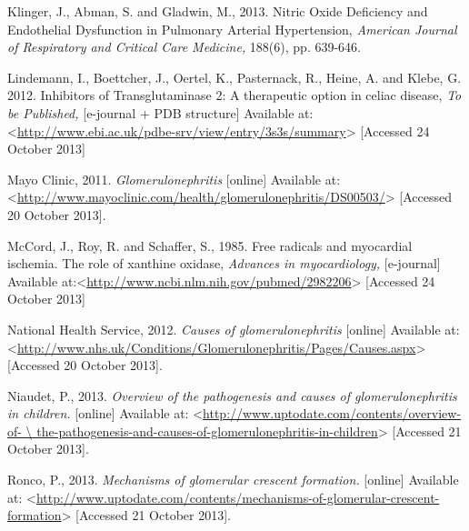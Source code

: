 \documentclass[12pt]{report}
\begin{document}
Klinger, J., Abman, S. and Gladwin, M., 2013. Nitric Oxide Deficiency and Endothelial Dysfunction in Pulmonary Arterial Hypertension, \textit{American Journal of Respiratory and Critical Care Medicine,} 188(6), pp. 639-646.
\newline
\newline

Lindemann, I., Boettcher, J., Oertel, K., Pasternack, R., Heine, A. and Klebe, G. 2012. Inhibitors of Transglutaminase 2: A therapeutic option in celiac disease, \textit{To be Published,} [e-journal + PDB structure] Available at:<\url{http://www.ebi.ac.uk/pdbe-srv/view/entry/3s3s/summary}> [Accessed 24 October 2013]
\newline
\newline

Mayo Clinic, 2011. \textit{Glomerulonephritis} [online] Available at: <\url{http://www.mayoclinic.com/health/glomerulonephritis/DS00503/}> [Accessed 20 October 2013].
\newline
\newline

McCord, J., Roy, R. and Schaffer, S., 1985. Free radicals and myocardial ischemia. The role of xanthine oxidase, \textit{Advances in myocardiology,} [e-journal] Available at:<\url{http://www.ncbi.nlm.nih.gov/pubmed/2982206}> [Accessed 24 October 2013]
\newline
\newline

National Health Service, 2012. \textit{Causes of glomerulonephritis} [online] Available at: <\url{http://www.nhs.uk/Conditions/Glomerulonephritis/Pages/Causes.aspx}> [Accessed 20 October 2013].
\newline
\newline

Niaudet, P., 2013. \textit{Overview of the pathogenesis and causes of glomerulonephritis in children.} [online] Available at: <\url{http://www.uptodate.com/contents/overview-of- \ the-pathogenesis-and-causes-of-glomerulonephritis-in-children}> [Accessed 21 October 2013].
\newline
\newline

Ronco, P., 2013. \textit{Mechanisms of glomerular crescent formation.} [online] Available at: <\url{http://www.uptodate.com/contents/mechanisms-of-glomerular-crescent-formation}> [Accessed 21 October 2013].
\newline
\newline
\end{document}
